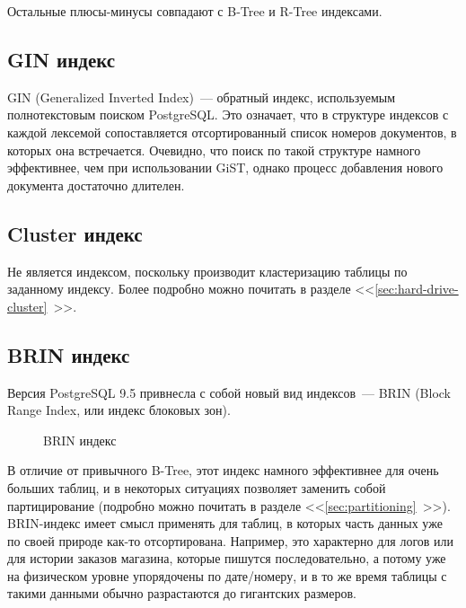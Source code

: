 Остальные плюсы-минусы совпадают с B-Tree и R-Tree индексами.



\subsection{GIN индекс}

GIN (Generalized Inverted Index)~--- обратный индекс, используемым полнотекстовым поиском PostgreSQL. Это означает, что в структуре индексов с каждой лексемой сопоставляется отсортированный список номеров документов, в которых она встречается. Очевидно, что поиск по такой структуре намного эффективнее, чем при использовании GiST, однако процесс добавления нового документа достаточно длителен.



\subsection{Cluster индекс}

Не является индексом, поскольку производит кластеризацию таблицы по заданному индексу. Более подробно можно почитать в разделе <<\ref{sec:hard-drive-cluster}~>>.



\subsection{BRIN индекс}

Версия PostgreSQL 9.5 привнесла с собой новый вид индексов~--- BRIN (Block Range Index, или индекс блоковых зон).

\begin{figure}[ht!]
  \caption{BRIN индекс}
  \label{fig:brin_index}
\end{figure}

В отличие от привычного B-Tree, этот индекс намного эффективнее для очень больших таблиц, и в некоторых ситуациях позволяет заменить собой партицирование (подробно можно почитать в разделе <<\ref{sec:partitioning}~>>). BRIN-индекс имеет смысл применять для таблиц, в которых часть данных уже по своей природе как-то отсортирована. Например, это характерно для логов или для истории заказов магазина, которые пишутся последовательно, а потому уже на физическом уровне упорядочены по дате/номеру, и в то же время таблицы с такими данными обычно разрастаются до гигантских размеров.

